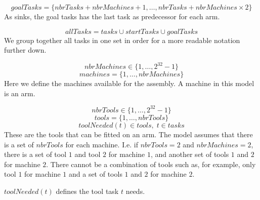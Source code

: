  \begin{equation}\label{eq:20}
 goalTasks = \{nbrTasks+nbrMachines+1 , \ldots , nbrTasks+nbrMachines \times 2\}\end{equation}
 As sinks, the goal tasks has the last task as predecessor for each arm.
 
 \begin{equation}\label{eq:21}
 allTasks = tasks \cup startTasks \cup goalTasks
 \end{equation}
 We group together all tasks in one set in order for a more readable notation further down.
 
 \begin{equation}\label{eq:2}
 nbrMachines \in \{1 , \ldots , 2^{32}-1\}
 \end{equation}
 \begin{equation}\label{eq:11}
 machines = \{1 , \ldots , nbrMachines\}
 \end{equation}
 Here we define the machines available for the assembly. A machine in this model is an arm.
 
 \begin{equation}\label{eq:3}
 nbrTools \in \{1 , \ldots , 2^{32}-1\}
 \end{equation}
 \begin{equation}\label{eq:12}
 tools = \{1 , \ldots , nbrTools\}
 \end{equation}
 \begin{equation}\label{eq:33}
 toolNeeded(t) \in tools, \; t \in tasks
 \end{equation} 
 These are the tools that can be fitted on an arm. The model assumes that there is a set of $nbrTools$ for each machine. I.e. if $nbrTools = 2$ and $nbrMachines = 2$, there is a set of tool $1$ and tool $2$ for machine $1$, and another set of tools $1$ and $2$ for machine $2$. There cannot be a combination of tools such as, for example, only tool $1$ for machine $1$ and a set of tools $1$ and $2$ for machine $2$.
 
 $toolNeeded(t)$ defines the tool task $t$ needs.
 
